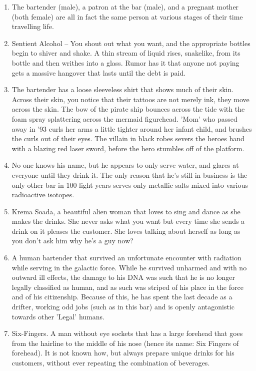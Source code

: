 \documentclass{article}
\begin{document}
\begin{enumerate}
	\item The bartender (male), a patron at the bar (male), and a pregnant mother (both female) are all in fact the same person at various stages of their time travelling life.
	\item Sentient Alcohol – You shout out what you want, and the appropriate bottles begin to shiver and shake. A thin stream of liquid rises, snakelike, from its bottle and then writhes into a glass. Rumor has it that anyone not paying gets a massive hangover that lasts until the debt is paid.
	\item The bartender has a loose sleeveless shirt that shows much of their skin. Across their skin, you notice that their tattoos are not merely ink, they move across the skin. The bow of the pirate ship bounces across the tide with the foam spray splattering across the mermaid figurehead. 'Mom' who passed away in '93 curls her arms a little tighter around her infant child, and brushes the curls out of their eyes. The villain in black robes severs the heroes hand with a blazing red laser sword, before the hero stumbles off of the platform.
	\item No one knows his name, but he appears to only serve water, and glares at everyone until they drink it. The only reason that he's still in business is the only other bar in 100 light years serves only metallic salts mixed into various radioactive isotopes.
	\item Krema Soada, a beautiful alien woman that loves to sing and dance as she makes the drinks. She never asks what you want but every time she sends a drink on it pleases the customer. She loves talking about herself as long as you don't ask him why he's a guy now?
	\item A human bartender that survived an unfortunate encounter with radiation while serving in the galactic force. While he survived unharmed and with no outward ill effects, the damage to his DNA was such that he is no longer legally classified as human, and as such was striped of his place in the force and of his citizenship. Because of this, he has spent the last decade as a drifter, working odd jobs (such as in this bar) and is openly antagonistic towards other 'Legal' humans.
	\item Six-Fingers. A man without eye sockets that has a large forehead that goes from the hairline to the middle of his nose (hence its name: Six Fingers of forehead). It is not known how, but always prepare unique drinks for his customers, without ever repeating the combination of beverages.

\end{enumerate}
\end{document}

